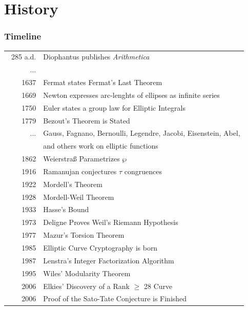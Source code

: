 \documentclass{beamer}
\begin{document}
\section{History}
\begin{frame}
\frametitle{Timeline}
{\scriptsize
{\linespread{1}
\begin{table}[htbp]
\centering
\label{tbl:1}
\begin{tabular}{r l}
\hline
~285 a.d.  & Diophantus publishes \textit{Arithmetica} \\
...  & \\
1637 & Fermat states Fermat's Last Theorem \\
1669 & Newton expresses arc-lenghts of ellipses as infinite series  \\
1750 & Euler states a group law for Elliptic Integrals  \\
1779 & Bezout's Theorem is Stated  \\
...  & Gauss, Fagnano, Bernoulli, Legendre, Jacobi, Eisenstein, Abel,  \\
& and others work on elliptic functions  \\
1862 & Weierstra{\ss} Parametrizes $\wp$  \\
1916 & Ramanujan conjectures $\tau$ congruences  \\
1922 & Mordell's Theorem  \\
1928 & Mordell-Weil Theorem \\
1933 & Hasse's Bound  \\
1973 & Deligne Proves Weil's Riemann Hypothesis  \\
1977 & Mazur's Torsion Theorem  \\
1985 & Elliptic Curve Cryptography is born  \\
1987 & Lenstra's Integer Factorization Algorithm  \\
1995 & Wiles' Modularity Theorem  \\
2006 & Elkies' Discovery of a Rank $\geq$ 28 Curve  \\
2006 & Proof of the Sato-Tate Conjecture is Finished  \\
\hline
\end{tabular}
\end{table}
}}
\end{frame}
\end{document}
